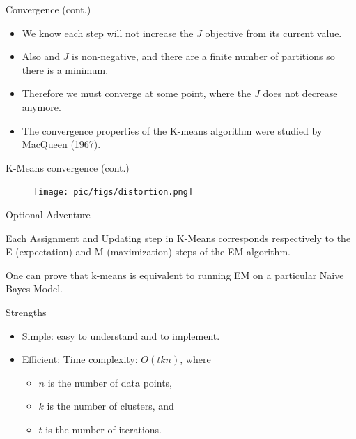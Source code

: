 \documentclass[serif, aspectratio=169]{beamer}
\begin{document}
\begin{frame}{Convergence (cont.)}
    \begin{itemize}
\item We know each step will not increase the $J$ objective from its current value.
\item  Also and $J$ is non-negative, and there are a finite number of partitions so there is a minimum.
 \item  Therefore we must converge at some point, where the $J$ does not decrease anymore.
\item  The convergence properties of the K-means algorithm were studied by MacQueen (1967).

    \end{itemize}
\end{frame}


\begin{frame}{K-Means convergence (cont.)}
    \begin{figure}
        \centering
        \texttt{[image: pic/figs/distortion.png]}
    \end{figure}
\end{frame}

\begin{frame}{Optional Adventure}
    \item  Each Assignment and Updating step in K-Means corresponds respectively to the E (expectation) and M (maximization) steps of the EM algorithm.
    \item One can prove that k-means is equivalent to running EM on a particular Naive Bayes Model.  
\end{frame}

\begin{frame}{Strengths}
    \begin{itemize}
        \item Simple: easy to understand and to implement.
        \item  Efficient: Time complexity: $O(tkn)$, 
where
\begin{itemize}
    
\item  $n$ is the number of data points, 
\item $k$ is the number of clusters, and 
\item $t$ is the number of iterations. 
\end{itemize}
        
    \end{itemize}
\end{frame}
\end{document}
